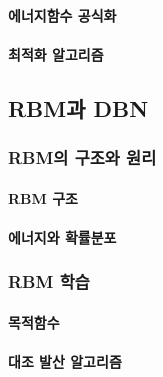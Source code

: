 \documentclass [12pt] {oblivoir}
\let\oldsubsubsection=\subsubsection
\renewcommand{\subsubsection}
{
  \filbreak
  \oldsubsubsection
}
\begin{document}
\paragraph*{에너지함수 공식화}\mbox{}

\vspace{3mm}

\paragraph*{최적화 알고리즘}\mbox{}

\vspace{3mm}

\subsection{RBM과 DBN}

\subsubsection{RBM의 구조와 원리}

\paragraph*{RBM 구조}\mbox{}

\vspace{3mm}

\paragraph*{에너지와 확률분포}\mbox{}

\vspace{3mm}

\subsubsection{RBM 학습}

\paragraph*{목적함수}\mbox{}

\vspace{3mm}

\paragraph*{대조 발산 알고리즘}\mbox{}

\vspace{3mm}
\end{document}
